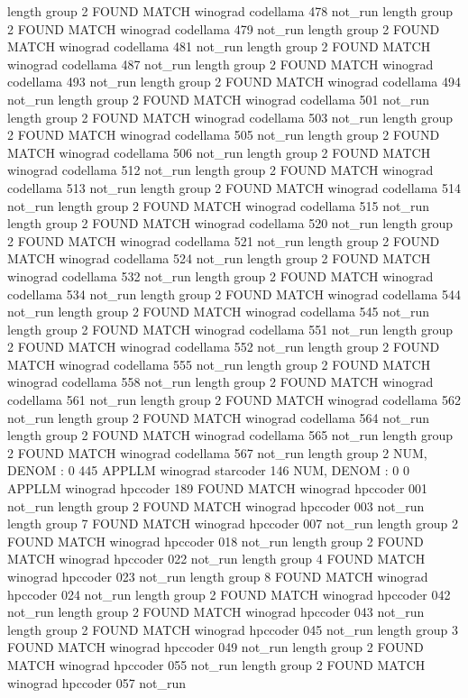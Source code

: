 length group  2
FOUND MATCH winograd codellama 478 not_run
length group  2
FOUND MATCH winograd codellama 479 not_run
length group  2
FOUND MATCH winograd codellama 481 not_run
length group  2
FOUND MATCH winograd codellama 487 not_run
length group  2
FOUND MATCH winograd codellama 493 not_run
length group  2
FOUND MATCH winograd codellama 494 not_run
length group  2
FOUND MATCH winograd codellama 501 not_run
length group  2
FOUND MATCH winograd codellama 503 not_run
length group  2
FOUND MATCH winograd codellama 505 not_run
length group  2
FOUND MATCH winograd codellama 506 not_run
length group  2
FOUND MATCH winograd codellama 512 not_run
length group  2
FOUND MATCH winograd codellama 513 not_run
length group  2
FOUND MATCH winograd codellama 514 not_run
length group  2
FOUND MATCH winograd codellama 515 not_run
length group  2
FOUND MATCH winograd codellama 520 not_run
length group  2
FOUND MATCH winograd codellama 521 not_run
length group  2
FOUND MATCH winograd codellama 524 not_run
length group  2
FOUND MATCH winograd codellama 532 not_run
length group  2
FOUND MATCH winograd codellama 534 not_run
length group  2
FOUND MATCH winograd codellama 544 not_run
length group  2
FOUND MATCH winograd codellama 545 not_run
length group  2
FOUND MATCH winograd codellama 551 not_run
length group  2
FOUND MATCH winograd codellama 552 not_run
length group  2
FOUND MATCH winograd codellama 555 not_run
length group  2
FOUND MATCH winograd codellama 558 not_run
length group  2
FOUND MATCH winograd codellama 561 not_run
length group  2
FOUND MATCH winograd codellama 562 not_run
length group  2
FOUND MATCH winograd codellama 564 not_run
length group  2
FOUND MATCH winograd codellama 565 not_run
length group  2
FOUND MATCH winograd codellama 567 not_run
length group  2
NUM, DENOM : 0 445
APPLLM winograd starcoder
146
NUM, DENOM : 0 0
APPLLM winograd hpccoder
189
FOUND MATCH winograd hpccoder 001 not_run
length group  2
FOUND MATCH winograd hpccoder 003 not_run
length group  7
FOUND MATCH winograd hpccoder 007 not_run
length group  2
FOUND MATCH winograd hpccoder 018 not_run
length group  2
FOUND MATCH winograd hpccoder 022 not_run
length group  4
FOUND MATCH winograd hpccoder 023 not_run
length group  8
FOUND MATCH winograd hpccoder 024 not_run
length group  2
FOUND MATCH winograd hpccoder 042 not_run
length group  2
FOUND MATCH winograd hpccoder 043 not_run
length group  2
FOUND MATCH winograd hpccoder 045 not_run
length group  3
FOUND MATCH winograd hpccoder 049 not_run
length group  2
FOUND MATCH winograd hpccoder 055 not_run
length group  2
FOUND MATCH winograd hpccoder 057 not_run
